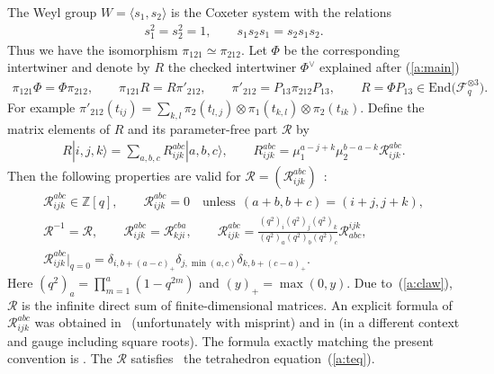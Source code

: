 \documentclass[11pt]{article}
\begin{document}
The Weyl group $W=\langle s_1, s_2 \rangle$ is the Coxeter system
with the relations
\begin{gather*}
s_1^2=s_2^2=1,\qquad
s_1s_2s_1 = s_2s_1s_2.
\end{gather*}
Thus we have the isomorphism
$\pi_{121} \simeq \pi_{212}$.
Let $\Phi$ be the corresponding intertwiner and denote by $R$
the checked intertwiner $\Phi^\vee$ explained after (\ref{a:main})
\begin{gather*}
 \pi_{121} \Phi = \Phi  \pi_{212},\qquad
\pi_{121} R = R  \pi'_{212},
\qquad \pi'_{212} = P_{13}\pi_{212}P_{13},\qquad
 R = \Phi P_{13}\in \mathrm{End}\big(\mathcal{F}_q^{\otimes 3}\big).
\end{gather*}
For example
$\pi'_{212}(t_{ij}) = \sum_{k,l}
\pi_2(t_{l,j})\otimes \pi_1(t_{k,l})\otimes \pi_2(t_{ik})$.
Def\/ine the matrix elements of $R$ and its parameter-free part
$\mathscr{R}$ by
\begin{gather*}
R |i,j,k \rangle=
\sum_{a,b,c}R^{abc}_{ijk}|a,b,c \rangle,
\qquad
R^{abc}_{ijk}  = \mu_1^{a-j+k}\mu_2^{b-a-k}
\mathscr{R}^{abc}_{ijk}.
\end{gather*}
Then the following properties are valid for
$\mathscr{R} = (\mathscr{R}^{abc}_{ijk})$~\cite{KO1}:
\begin{gather}
 \mathscr{R}^{abc}_{ijk} \in \mathbb{Z}[q],\qquad
\mathscr{R}^{abc}_{ijk}=0 \quad \mathrm{unless}\ \ (a+b, b+c)=(i+j,j+k),
\label{a:claw}\\
 \mathscr{R}^{-1} = \mathscr{R},
\qquad\mathscr{R}^{abc}_{ijk} = \mathscr{R}^{cba}_{kji},\qquad
{\mathscr{R}}^{abc}_{ijk}
= \frac{(q^2)_i(q^2)_j(q^2)_k}{(q^2)_a(q^2)_b(q^2)_c}
{\mathscr{R}}^{ijk}_{abc},\label{a:rprop}\\
\mathscr{R}^{abc}_{ijk}|_{q=0} = \delta_{i, b+(a-c)_+}\delta_{j,\min(a,c)}
\delta_{k, b+(c-a)_+}.\label{a:r0}
\end{gather}
Here $(q^2)_a = \prod\limits_{m=1}^a(1-q^{2m})$
and $(y)_+ = \max(0,y)$.
Due to~(\ref{a:claw}), $\mathscr{R}$ is the inf\/inite direct sum
of f\/inite-dimensional matrices.
An explicit formula of $\mathscr{R}^{abc}_{ijk}$ was obtained in~\cite{KV} (unfortunately with misprint) and in
\cite[equation~(59)]{BMS} (in a dif\/ferent context and gauge including square roots).
The formula exactly matching the present convention is
\cite[equation~(2.20)]{KO1}.
The $\mathscr{R}$ satisf\/ies~\cite{KV}
the tetrahedron equation~(\ref{a:teq}).
\end{document}
